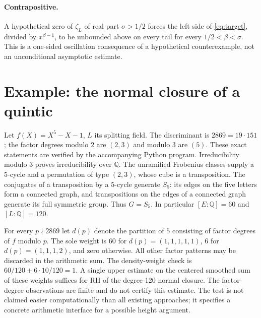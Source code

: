\documentclass[11pt]{article}
\theoremstyle{remark}\newtheorem{remark}[theorem]{Remark}
\newcommand{\Q}{\mathbb Q}
\begin{document}
\paragraph{Contrapositive.} A hypothetical zero of $\zeta_L$ of real part $\sigma>1/2$ forces the left side of \eqref{eq:target}, divided by $x^{\beta-1}$, to be unbounded above on every tail for every $1/2<\beta<\sigma$. This is a one-sided oscillation consequence of a hypothetical counterexample, not an unconditional asymptotic estimate.

\section{Example: the normal closure of a quintic}
Let $f(X)=X^5-X-1$, $L$ its splitting field. The discriminant is $2869=19\cdot151$; the factor degrees modulo $2$ are $(2,3)$ and modulo $3$ are $(5)$. These exact statements are verified by the accompanying Python program. Irreducibility modulo $3$ proves irreducibility over $\Q$. The unramified Frobenius classes supply a $5$-cycle and a permutation of type $(2,3)$, whose cube is a transposition. The conjugates of a transposition by a $5$-cycle generate $S_5$: its edges on the five letters form a connected graph, and transpositions on the edges of a connected graph generate its full symmetric group. Thus $G=S_5$. In particular $[E:\Q]=60$ and $[L:\Q]=120$.

For every $p\nmid2869$ let $d(p)$ denote the partition of $5$ consisting of factor degrees of $f$ modulo $p$. The sole weight is $60$ for $d(p)=(1,1,1,1,1)$, $6$ for $d(p)=(1,1,1,2)$, and zero otherwise. All other factor patterns may be discarded in the arithmetic sum. The density-weight check is $60/120+6\cdot10/120=1$. A single upper estimate on the centered smoothed sum of these weights suffices for RH of the degree-120 normal closure. The factor-degree observations are finite and do not certify this estimate. The test is not claimed easier computationally than all existing approaches; it specifies a concrete arithmetic interface for a possible height argument.
\end{document}
